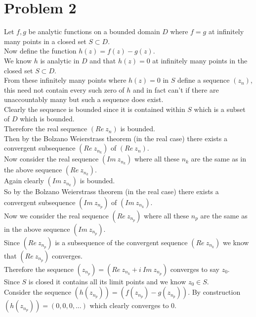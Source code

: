 \documentclass{article}
\begin{document}
\newpage
\section*{Problem 2}

\begin{center}
    \doublespacing
    Let $f, g$ be analytic functions on a bounded domain $D$ where $f = g$ at infinitely many points in a closed set $S\subset D$.
    \\Now define the function $h(z) = f(z) - g(z)$.
    \\We know $h$ is analytic in $D$ and that $h(z) = 0$ at infinitely many points in the closed set $S\subset D$.
    \\From these infinitely many points where $h(z) = 0$ in $S$ define a sequence $(z_n)$, this need not contain every such zero of $h$ and in fact can't if there are unaccountably many but such a sequence does exist.
    \break
    \\Clearly the sequence is bounded since it is contained within $S$ which is a subset of $D$ which is bounded.
    \\Therefore the real sequence $(Re\:z_n)$ is bounded.
    \\Then by the Bolzano Weierstrass theorem (in the real case) there exists a convergent subsequence $(Re\:z_{n_k})$ of $(Re\:z_n)$.
    \\Now consider the real sequence $(Im\:z_{n_k})$ where all these $n_k$ are the same as in the above sequence $(Re\:z_{n_k})$.
    \\Again clearly $(Im\:z_{n_k})$ is bounded.
    \\So by the Bolzano Weierstrass theorem (in the real case) there exists a convergent subsequence $(Im\:z_{n_p})$ of $(Im\:z_{n_k})$.
    \\Now we consider the real sequence $(Re\:z_{n_p})$ where all these $n_p$ are the same as in the above sequence $(Im\:z_{n_p})$.
    \\Since $(Re\:z_{n_p})$ is a subsequence of the convergent sequence $(Re\:z_{n_k})$ we know that $(Re\:z_{n_p})$ converges.
    \\Therefore the sequence $(z_{n_p}) = (Re\:z_{n_k} + i\:Im\:z_{n_p})$ converges to say $z_0$.
    \\Since $S$ is closed it contains all its limit points and we know $z_0\in S$.
    \\Consider the sequence $(h(z_{n_p})) = (f(z_{n_p}) - g(z_{n_p}))$. By construction $(h(z_{n_p})) = (0, 0, 0, ...)$ which clearly converges to 0.

\end{center}
\end{document}
